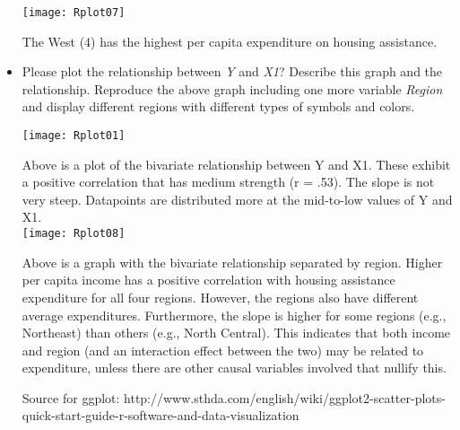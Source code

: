 \documentclass[12pt,letterpaper]{article}
\begin{document}
\begin{itemize}
\texttt{[image: Rplot07]}

  

The West (4) has the highest per capita expenditure on housing assistance.\\

\item
Please plot the relationship between \emph{Y} and \emph{X1}? Describe this graph and the relationship. Reproduce the above graph including one more variable \emph{Region} and display different regions with different types of symbols and colors.

\texttt{[image: Rplot01]}

 

Above is a plot of the bivariate relationship between Y and X1. These exhibit a positive correlation that has medium strength (r = .53). The slope is not very steep. Datapoints are distributed more at the mid-to-low values of Y and X1.\\

\texttt{[image: Rplot08]}

 

Above is a graph with the bivariate relationship separated by region. Higher per capita income has a positive correlation with housing assistance expenditure for all four regions. However, the regions also have different average expenditures. Furthermore, the slope is higher for some regions (e.g., Northeast) than others (e.g., North Central). This indicates that both income and region (and an interaction effect between the two) may be related to expenditure, unless there are other causal variables involved that nullify this.

Source for ggplot: http://www.sthda.com/english/wiki/ggplot2-scatter-plots-quick-start-guide-r-software-and-data-visualization

\end{itemize}
\end{document}
